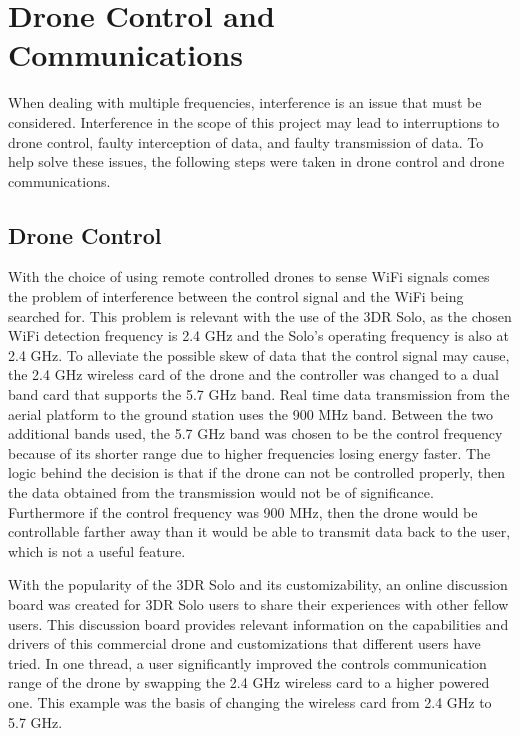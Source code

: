 \section{Drone Control and Communications}
When dealing with multiple frequencies, interference is an issue that must be considered. Interference in the scope of this project may lead to interruptions to drone control, faulty interception of data, and faulty transmission of data. To help solve these issues, the following steps were taken in drone control and drone communications.\par 

\subsection{Drone Control}
With the choice of using remote controlled drones to sense WiFi signals comes the problem of interference between the control signal and the WiFi being searched for. This problem is relevant with the use of the 3DR Solo, as the chosen WiFi detection frequency is 2.4 GHz and the Solo’s operating frequency is also at 2.4 GHz. To alleviate the possible skew of data that the control signal may cause, the 2.4 GHz wireless card of the drone and the controller was changed to a dual band card that supports the 5.7 GHz band. Real time data transmission from the aerial platform to the ground station uses the 900 MHz band. Between the two additional bands used, the 5.7 GHz band was chosen to be the control frequency because of its shorter range due to higher frequencies losing energy faster. The logic behind the decision is that if the drone can not be controlled properly, then the data obtained from the transmission would not be of significance. Furthermore if the control frequency was 900 MHz, then the drone would be controllable farther away than it would be able to transmit data back to the user, which is not a useful feature.\par 
With the popularity of the 3DR Solo and its customizability, an online discussion board was created for 3DR Solo users to share their experiences with other fellow users. This discussion board provides relevant information on the capabilities and drivers of this commercial drone and customizations that different users have tried. In one thread, a user significantly improved the controls communication range of the drone by swapping the 2.4 GHz wireless card to a higher powered one. This example was the basis of changing the wireless card from 2.4 GHz to 5.7 GHz.\par 
